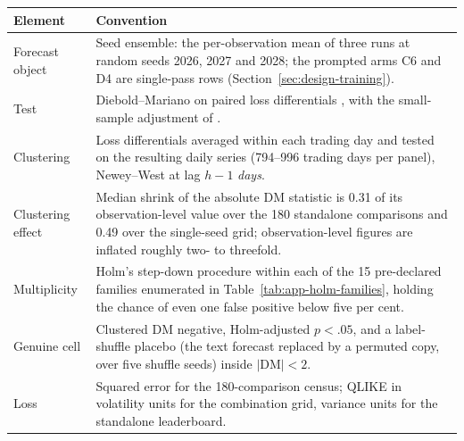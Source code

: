 \begin{center}
\captionsetup{type=table,hypcap=false}
\caption[The primary basis of the results chapter]{The primary basis. Sections~\ref{sec:design-training}, \ref{sec:design-ladder} and~\ref{sec:design-inference} fix these conventions; they are restated here because every headline count below is read against them.}
\label{tab:res-basis}
{\small\singlespacing
\begin{tabular}{@{}>{\raggedright\arraybackslash}p{}>{\raggedright\arraybackslash}p{}@{}}
\toprule
Element & Convention \\
\midrule
Forecast object & Seed ensemble: the per-observation mean of three runs at random seeds 2026, 2027 and 2028; the prompted arms C6 and D4 are single-pass rows (Section~\ref{sec:design-training}). \\ %
Test & Diebold--Mariano on paired loss differentials \cite{diebold1995comparing}, with the small-sample adjustment of \cite{harvey1997testing}. \\ %
Clustering & Loss differentials averaged within each trading day and tested on the resulting daily series (794--996 trading days per panel), Newey--West at lag $h-1$ \emph{days}. \\ %
Clustering effect & Median shrink of the absolute DM statistic is 0.31 of its observation-level value over the 180 standalone comparisons and 0.49 over the single-seed grid; observation-level figures are inflated roughly two- to threefold. \\ %
Multiplicity & Holm's step-down procedure \cite{holm1979simple} within each of the 15 pre-declared families enumerated in Table~\ref{tab:app-holm-families}, holding the chance of even one false positive below five per cent. \\ %
Genuine cell & Clustered DM negative, Holm-adjusted $p<.05$, and a label-shuffle placebo (the text forecast replaced by a permuted copy, over five shuffle seeds) inside $|\mathrm{DM}|<2$. \\ %
Loss & Squared error for the 180-comparison census; QLIKE \cite{patton2011proxies} in volatility units for the combination grid, variance units for the standalone leaderboard. \\ %

\end{tabular}}
\end{center}
